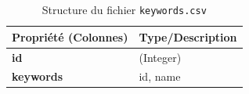 \documentclass[a4paper,12pt]{report}
\begin{document}
\begin{enumerate}[label=A.\arabic*, leftmargin=1.7cm]
        \begin{table}[!h]
            \centering
            \begin{tabular}[t]{@{}ll@{}}
                \toprule
                \textbf{Propriété (Colonnes)} & \textbf{Type/Description} \\
                \midrule
                \textbf{id} & (Integer)\\
                \textbf{keywords} & id, name \\
                \bottomrule
            \end{tabular}
            \caption{Structure du fichier \texttt{keywords.csv}}
        \end{table}
        
\end{enumerate}
\end{document}
